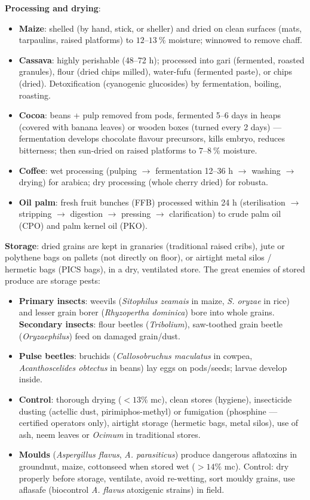 \documentclass[11pt]{article}
\newcommand{\cle}[1]{{\popxbold\color{popdark}#1}}
\begin{document}
\textbf{Processing and drying}: 
\begin{itemize}
\item \textbf{Maize}: shelled (by hand, stick, or sheller) and dried on clean surfaces (mats, tarpaulins, raised platforms) to $12$--$13\ \%$ moisture; winnowed to remove chaff.
\item \textbf{Cassava}: highly perishable (48--72 h); processed into gari (fermented, roasted granules), flour (dried chips milled), water-fufu (fermented paste), or chips (dried). Detoxification (cyanogenic glucosides) by fermentation, boiling, roasting.
\item \textbf{Cocoa}: beans + pulp removed from pods, fermented 5--6 days in heaps (covered with banana leaves) or wooden boxes (turned every 2 days) — fermentation develops chocolate flavour precursors, kills embryo, reduces bitterness; then sun-dried on raised platforms to $7$--$8\ \%$ moisture.
\item \textbf{Coffee}: wet processing (pulping $\rightarrow$ fermentation 12--36 h $\rightarrow$ washing $\rightarrow$ drying) for arabica; dry processing (whole cherry dried) for robusta.
\item \textbf{Oil palm}: fresh fruit bunches (FFB) processed within 24 h (sterilisation $\rightarrow$ stripping $\rightarrow$ digestion $\rightarrow$ pressing $\rightarrow$ clarification) to crude palm oil (CPO) and palm kernel oil (PKO).
\end{itemize}

\textbf{Storage}: dried grains are kept in granaries (traditional raised cribs), jute or polythene bags on pallets (not directly on floor), or airtight metal silos / hermetic bags (PICS bags), in a dry, ventilated store. The great enemies of stored produce are \cle{storage pests}:

\begin{itemize}
\item \textbf{Primary insects}: weevils (\emph{Sitophilus zeamais} in maize, \emph{S. oryzae} in rice) and lesser grain borer (\emph{Rhyzopertha dominica}) bore into whole grains. \textbf{Secondary insects}: flour beetles (\emph{Tribolium}), saw-toothed grain beetle (\emph{Oryzaephilus}) feed on damaged grain/dust.
\item \textbf{Pulse beetles}: bruchids (\emph{Callosobruchus maculatus} in cowpea, \emph{Acanthoscelides obtectus} in beans) lay eggs on pods/seeds; larvae develop inside.
\item \textbf{Control}: thorough drying ($<13\%$ mc), clean stores (hygiene), insecticide dusting (actellic dust, pirimiphos-methyl) or fumigation (phosphine — certified operators only), airtight storage (hermetic bags, metal silos), use of ash, neem leaves or \emph{Ocimum} in traditional stores.
\item \textbf{Moulds} (\emph{Aspergillus flavus}, \emph{A. parasiticus}) produce dangerous aflatoxins in groundnut, maize, cottonseed when stored wet ($>14\%$ mc). Control: dry properly before storage, ventilate, avoid re-wetting, sort mouldy grains, use aflasafe (biocontrol \emph{A. flavus} atoxigenic strains) in field.
\end{itemize}
\end{document}
